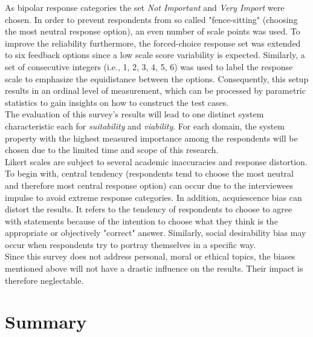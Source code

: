 As bipolar response categories the set \textit{Not Important} and \textit{Very Import} were chosen. In order to prevent respondents from so called "fence-sitting" (choosing the most neutral response option), an even number of scale points was used. To improve the reliability furthermore, the forced-choice response set was extended to six feedback options since a low scale score variability is expected.\autocite{Brill2008LikertScale} Similarly, a set of consecutive integers (i.e., 1, 2, 3, 4, 5, 6) was used to label the response scale to emphasize the equidistance between the options. Consequently, this setup results in an ordinal level of measurement, which can be processed by parametric statistics to gain insights on how to construct the test cases. \\
The evaluation of this survey's results will lead to one distinct system characteristic each for \textit{suitability} and \textit{viability}. For each domain, the system property with the highest measured importance among the respondents will be chosen due to the limited time and scope of this research. \\
Likert scales are subject to several academic inaccuracies and response distortion. To begin with, central tendency (respondents tend to choose the most neutral and therefore most central response option\autocite{Schumacker2013CentralDispersion}) can occur due to the interviewees impulse to avoid extreme response categories. In addition, acquiescence bias can distort the results. It refers to the tendency of respondents to choose to agree with statements because of the intention to choose what they think is the appropriate or objectively "correct" answer.\autocite{Costello2015AcquiescenceEducation}\highcomma\autocite{Aichholzer2015ControllingTests} Similarly, social desirability bias may occur when respondents try to portray themselves in a specific way.\autocite{Grimm2010SocialBias} \\
Since this survey does not address personal, moral or ethical topics, the biases mentioned above will not have a drastic influence on the results. Their impact is therefore neglectable. 




\section{Summary}

